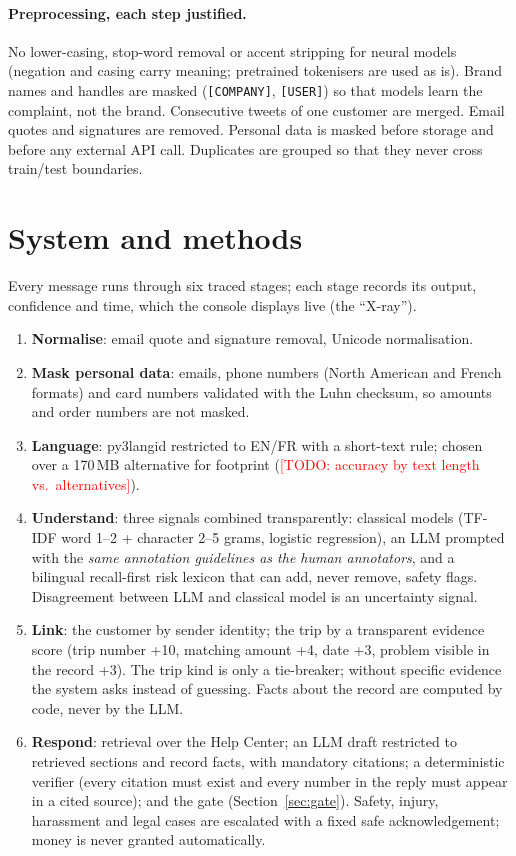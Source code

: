 \documentclass[11pt,a4paper]{article}
\newcommand{\todo}[1]{\textcolor{red}{[TODO: #1]}}
\begin{document}
\paragraph{Preprocessing, each step justified.} No lower-casing, stop-word removal or accent
stripping for neural models (negation and casing carry meaning; pretrained tokenisers are used as
is). Brand names and handles are masked (\texttt{[COMPANY]}, \texttt{[USER]}) so that models learn
the complaint, not the brand. Consecutive tweets of one customer are merged. Email quotes and
signatures are removed. Personal data is masked before storage and before any external API call.
Duplicates are grouped so that they never cross train/test boundaries.

\section{System and methods}
\label{sec:method}
Every message runs through six traced stages; each stage records its output, confidence and time,
which the console displays live (the ``X-ray'').
\begin{enumerate}
\item \textbf{Normalise}: email quote and signature removal, Unicode normalisation.
\item \textbf{Mask personal data}: emails, phone numbers (North American and French formats) and
card numbers validated with the Luhn checksum, so amounts and order numbers are not masked.
\item \textbf{Language}: py3langid \citep{lui2012langid} restricted to EN/FR with a short-text rule;
chosen over a 170\,MB alternative for footprint (\todo{accuracy by text length vs.\ alternatives}).
\item \textbf{Understand}: three signals combined transparently: classical models (TF-IDF word
1--2 + character 2--5 grams, logistic regression), an LLM prompted with the \emph{same annotation
guidelines as the human annotators}, and a bilingual recall-first risk lexicon that can add, never
remove, safety flags. Disagreement between LLM and classical model is an uncertainty signal.
\item \textbf{Link}: the customer by sender identity; the trip by a transparent evidence score
(trip number +10, matching amount +4, date +3, problem visible in the record +3). The trip kind is
only a tie-breaker; without specific evidence the system asks instead of guessing. Facts about the
record are computed by code, never by the LLM.
\item \textbf{Respond}: retrieval over the Help Center; an LLM draft restricted to retrieved
sections and record facts, with mandatory citations; a deterministic verifier (every citation must
exist and every number in the reply must appear in a cited source); and the gate (Section~\ref{sec:gate}).
Safety, injury, harassment and legal cases are escalated with a fixed safe acknowledgement; money is
never granted automatically.
\end{enumerate}
\end{document}
